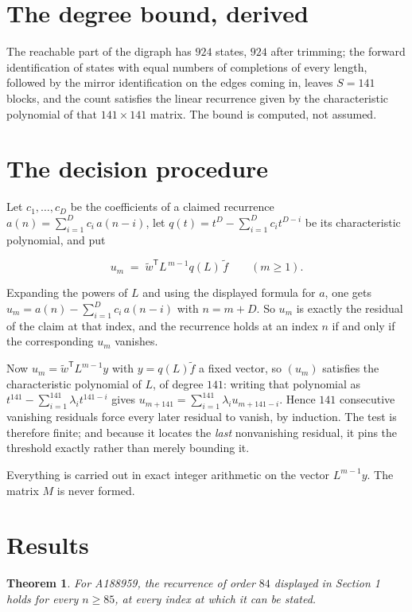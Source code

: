 \documentclass[11pt]{article}
\newtheorem{theorem}{Theorem}
\theoremstyle{definition}
\begin{document}
\section{The degree bound, derived}

The reachable part of the digraph has $924$ states, $924$ after trimming; the forward identification of states with equal numbers of completions of every length, followed by the mirror identification on the edges coming in, leaves $S = 141$ blocks, and the count satisfies the linear recurrence given by the characteristic polynomial of that $141\times141$ matrix. The bound is computed, not assumed.

\section{The decision procedure}

Let $c_1,\dots,c_D$ be the coefficients of a claimed recurrence $a(n) = \sum_{i=1}^{D} c_i\,a(n-i)$, let $q(t) = t^{D} - \sum_{i=1}^{D} c_i t^{D-i}$ be its characteristic polynomial, and put

\[u_m \;=\; \tilde w^{\mathsf T} L^{\,m-1} q(L)\,\tilde f \qquad (m \ge 1).\]

Expanding the powers of $L$ and using the displayed formula for $a$, one gets $u_m = a(n) - \sum_{i=1}^{D} c_i\,a(n-i)$ with $n = m + D$. So $u_m$ is exactly the residual of the claim at that index, and the recurrence holds at an index $n$ if and only if the corresponding $u_m$ vanishes.

Now $u_m = \tilde w^{\mathsf T} L^{m-1} y$ with $y = q(L)\tilde f$ a fixed vector, so $(u_m)$ satisfies the characteristic polynomial of $L$, of degree $141$: writing that polynomial as $t^{141} - \sum_{i=1}^{141} \lambda_i t^{141-i}$ gives $u_{m+141} = \sum_{i=1}^{141} \lambda_i u_{m+141-i}$. Hence $141$ consecutive vanishing residuals force every later residual to vanish, by induction. The test is therefore finite; and because it locates the {\itshape last} nonvanishing residual, it pins the threshold exactly rather than merely bounding it.

Everything is carried out in exact integer arithmetic on the vector $L^{m-1}y$. The matrix $M$ is never formed.

\section{Results}

\begin{theorem} For A188959, the recurrence of order $84$ displayed in Section 1 holds for every $n \ge 85$, at every index at which it can be stated.\end{theorem}
\end{document}
